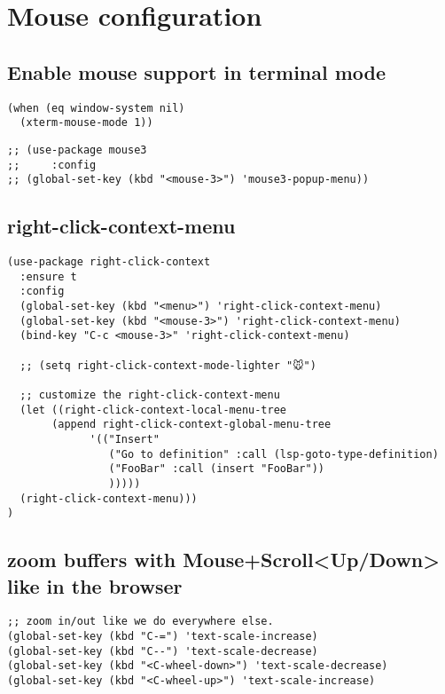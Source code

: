 \documentclass[11pt]{article}
\begin{document}
\section*{Mouse configuration}
\label{sec:org9c03fda}
\subsection*{Enable mouse support in terminal mode}
\label{sec:org029f738}

\begin{verbatim}
(when (eq window-system nil)
  (xterm-mouse-mode 1))
\end{verbatim}

\begin{verbatim}
;; (use-package mouse3
;;     :config
;; (global-set-key (kbd "<mouse-3>") 'mouse3-popup-menu))
\end{verbatim}

\subsection*{right-click-context-menu}
\label{sec:orgb154e82}

\begin{verbatim}
(use-package right-click-context
  :ensure t
  :config
  (global-set-key (kbd "<menu>") 'right-click-context-menu)
  (global-set-key (kbd "<mouse-3>") 'right-click-context-menu)
  (bind-key "C-c <mouse-3>" 'right-click-context-menu)

  ;; (setq right-click-context-mode-lighter "🐭")

  ;; customize the right-click-context-menu
  (let ((right-click-context-local-menu-tree
       (append right-click-context-global-menu-tree
             '(("Insert"
                ("Go to definition" :call (lsp-goto-type-definition)
                ("FooBar" :call (insert "FooBar"))
                )))))
  (right-click-context-menu)))
)
\end{verbatim}

\subsection*{zoom buffers with Mouse+Scroll<Up/Down> like in the browser}
\label{sec:org8ff1f5c}

\begin{verbatim}
;; zoom in/out like we do everywhere else.
(global-set-key (kbd "C-=") 'text-scale-increase)
(global-set-key (kbd "C--") 'text-scale-decrease)
(global-set-key (kbd "<C-wheel-down>") 'text-scale-decrease)
(global-set-key (kbd "<C-wheel-up>") 'text-scale-increase)
\end{verbatim}
\end{document}
